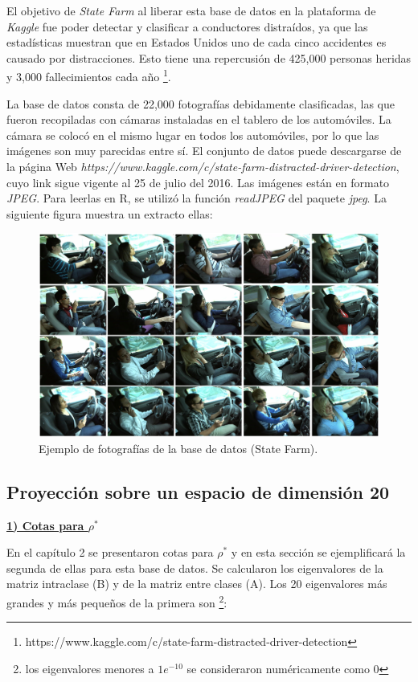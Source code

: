 El objetivo de \textit{State Farm} al liberar esta base de datos en la plataforma de \textit{Kaggle} fue poder detectar y clasificar a conductores distraídos, ya que las estadísticas muestran que en Estados Unidos uno de cada cinco accidentes es causado por distracciones. Esto tiene una repercusión de 425,000 personas heridas y 3,000 fallecimientos cada año \footnote{https://www.kaggle.com/c/state-farm-distracted-driver-detection}.

La base de datos consta de 22,000 fotografías debidamente clasificadas, las que fueron recopiladas con cámaras instaladas en el tablero de los automóviles. La cámara se colocó en el mismo lugar en todos los automóviles, por lo que las imágenes son muy parecidas entre sí. El conjunto de datos puede descargarse de la página Web \textit{https://www.kaggle.com/c/state-farm-distracted-driver-detection}, cuyo link sigue vigente al 25 de julio del 2016. Las imágenes están en formato \textit{JPEG}. Para leerlas en R, se utilizó la función \textit{readJPEG} del paquete \textit{jpeg}. La siguiente figura muestra un extracto ellas:

\begin{figure}[!ht]
  \centering
	\includegraphics[width=1\textwidth]{Figures/Chapter4_imagenStateFarm.png}	
  \caption{Ejemplo de fotografías de la base de datos (State Farm).}
\end{figure}

\subsection{Proyección sobre un espacio de dimensión 20}

\underline{\textbf{1) Cotas para $\rho^*$}}

En el capítulo 2 se presentaron cotas para $\rho^*$ y en esta sección se ejemplificará la segunda de ellas para esta base de datos. Se calcularon los eigenvalores de la matriz intraclase (B) y de la matriz entre clases (A). Los 20 eigenvalores más grandes y más pequeños de la primera son \footnote{los eigenvalores menores a $1e^{-10}$ se consideraron numéricamente como 0}:

